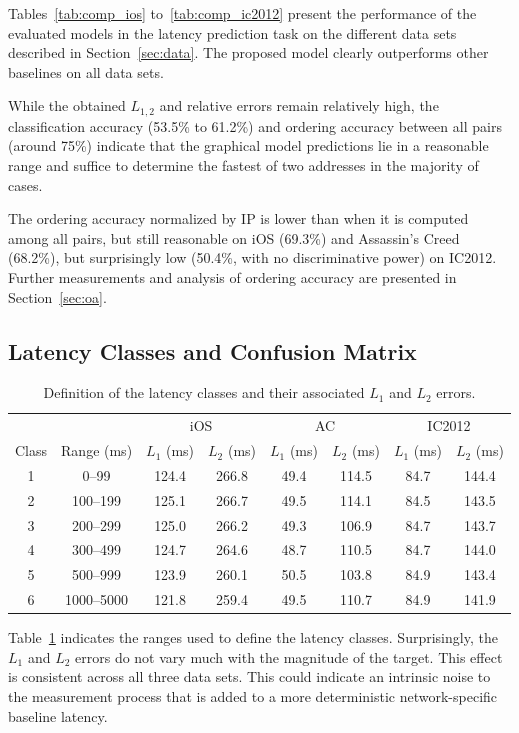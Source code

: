 \documentclass[10pt,a4paper,notitlepage,twocolumn]{article}
\begin{document}
Tables~\ref{tab:comp_ios} to~\ref{tab:comp_ic2012} present the
performance of the evaluated models in the latency prediction task on
the different data sets described in Section~\ref{sec:data}.
The proposed model clearly outperforms other baselines on all data sets.

While the obtained $L_{1,2}$ and relative errors remain relatively high,
the classification accuracy (53.5\% to 61.2\%) and ordering accuracy
between all pairs (around 75\%)
indicate that the graphical model predictions lie in a reasonable range
and suffice to determine the fastest of two addresses in the majority of
cases.

The ordering accuracy normalized by IP is lower than when it is computed
among all pairs, but still reasonable on iOS (69.3\%) and Assassin's
Creed (68.2\%), but surprisingly low (50.4\%, with no discriminative
power) on IC2012.  Further measurements and analysis of ordering
accuracy are presented in Section~\ref{sec:oa}.

\subsection{Latency Classes and Confusion Matrix}
\begin{table}[ht]
\centering
\begin{tabular}{|cc|cc|cc|cc|}
\hline
      &            & \multicolumn{2}{c|}{iOS} & \multicolumn{2}{c|}{AC} & \multicolumn{2}{c|}{IC2012} \\
Class & Range (ms) & $L_1$ (ms) & $L_2$ (ms) & $L_1$ (ms) & $L_2$ (ms) & $L_1$ (ms) & $L_2$ (ms) \\ \hline\hline
1 & 0--99      & 124.4 & 266.8 & 49.4 & 114.5 & 84.7 & 144.4 \\
2 & 100--199   & 125.1 & 266.7 & 49.5 & 114.1 & 84.5 & 143.5 \\
3 & 200--299   & 125.0 & 266.2 & 49.3 & 106.9 & 84.7 & 143.7 \\
4 & 300--499   & 124.7 & 264.6 & 48.7 & 110.5 & 84.7 & 144.0 \\
5 & 500--999   & 123.9 & 260.1 & 50.5 & 103.8 & 84.9 & 143.4 \\
6 & 1000--5000 & 121.8 & 259.4 & 49.5 & 110.7 & 84.9 & 141.9 \\
\hline
\end{tabular}
\caption{Definition of the latency classes and their associated $L_1$ and $L_2$ errors.}
\label{tab:cl_l12}
\end{table}


Table~\ref{tab:cl_l12} indicates the ranges used to define the latency
classes.  Surprisingly, the $L_1$ and $L_2$ errors do not vary much with
the magnitude of the target. This effect is consistent across all three
data sets.  This could indicate an intrinsic noise to the measurement
process that is added to a more deterministic network-specific baseline
latency.
\end{document}
